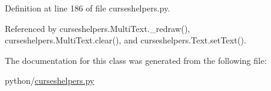 Definition at line 186 of file curseshelpers.\-py.



Referenced by curseshelpers.\-Multi\-Text.\-\_\-redraw(), curseshelpers.\-Multi\-Text.\-clear(), and curseshelpers.\-Text.\-set\-Text().



The documentation for this class was generated from the following file\-:\begin{DoxyCompactItemize}
\item 
python/\hyperlink{curseshelpers_8py}{curseshelpers.\-py}\end{DoxyCompactItemize}
